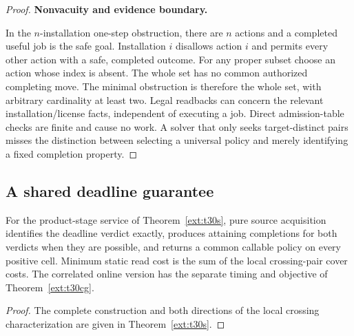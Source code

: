 \begin{proof}
\textbf{Nonvacuity and evidence boundary.}

In the \(n\)-installation one-step obstruction, there are \(n\) actions and a completed useful job is the safe goal. Installation \(i\) disallows action \(i\) and permits every other action with a safe, completed outcome. For any proper subset choose an action whose index is absent. The whole set has no common authorized completing move. The minimal obstruction is therefore the whole set, with arbitrary cardinality at least two. Legal readbacks can concern the relevant installation/license facts, independent of executing a job. Direct admission-table checks are finite and cause no work. A solver that only seeks target-distinct pairs misses the distinction between selecting a universal policy and merely identifying a fixed completion property.

\end{proof}

\subsection{A shared deadline guarantee}

\begin{theorem}\label{thm:t30}

For the product-stage service of Theorem~\ref{ext:t30s}, pure source acquisition identifies the deadline verdict exactly, produces attaining completions for both verdicts when they are possible, and returns a common callable policy on every positive cell. Minimum static read cost is the sum of the local crossing-pair cover costs. The correlated online version has the separate timing and objective of Theorem~\ref{ext:t30cg}.

\end{theorem}

\begin{proof}

The complete construction and both directions of the local crossing characterization are given in Theorem~\ref{ext:t30s}.

\end{proof}
